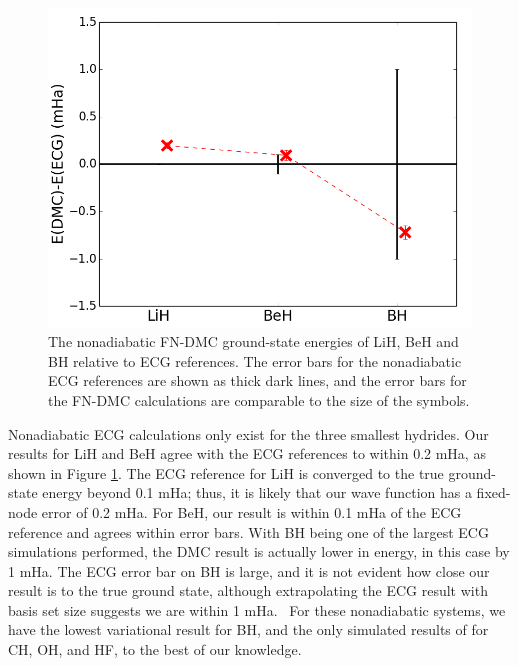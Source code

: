 \documentclass[aip,jcp,numerical,reprint]{revtex4-1}
\begin{document}

\begin{figure}[h]
\centering
\includegraphics[scale=.37]{dia-ECG}
\caption{The nonadiabatic FN-DMC ground-state energies of LiH, BeH and BH relative to ECG references. The error bars for the nonadiabatic ECG references are shown as thick dark lines, and the error bars for the FN-DMC calculations are comparable to the size of the symbols. \label{fig:dia-ECG}}
\end{figure}

Nonadiabatic ECG calculations only exist for the three smallest hydrides. Our results for LiH and BeH agree with the ECG references to within 0.2 mHa, as shown in Figure \ref{fig:dia-ECG}. The ECG reference for LiH is converged to the true ground-state energy beyond 0.1 mHa; thus, it is likely that our wave function has a fixed-node error of 0.2 mHa. For BeH, our result is within 0.1 mHa of the ECG reference and agrees within error bars. With BH being one of the largest ECG simulations performed, the DMC result is actually lower in energy, in this case by 1 mHa. The ECG error bar on BH is large, and it is not evident how close our result is to the true ground state, although extrapolating the ECG result with basis set size suggests we are within 1 mHa.~\cite{Bubin_BeH_noBO} For these nonadiabatic systems, we have the lowest variational result for BH, and the only simulated results of for CH, OH, and HF, to the best of our knowledge.
\end{document}
